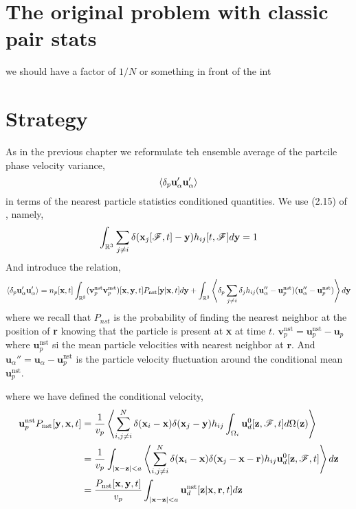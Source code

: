 \section{The original problem with classic pair stats}

we should have a factor of $1/N$ or something in front of the int 


\section{Strategy}

As in the previous chapter we reformulate teh ensemble average of the partcile phase velocity variance, 
\begin{equation}
    \pavg{\textbf{u}_\alpha'\textbf{u}_\alpha'}
\end{equation}
in terms of the nearest particle statistics conditioned quantities. 
We use (2.15) of \citet{zhang2021ensemble}, namely, 
\begin{equation}
    \int_{\mathbb{R}^3}
    \sum_{j\neq i}
    \delta(\textbf{x}_j[\FF,t] - \textbf{y}) h_{ij}[t,\FF] d\textbf{y}
    = 1
\end{equation}
And introduce the relation, 
\begin{equation}
    \pavg{\textbf{u}_\alpha'\textbf{u}_\alpha'}
    = 
    n_p[\textbf{x},t]
    \int_{\mathbb{R}^3}
    (\textbf{v}^\text{nst}_p
    \textbf{v}^\text{nst}_p)[\textbf{x},\textbf{y},t]
    P_\text{nst}[\textbf{y}|\textbf{x},t]
    d\textbf{y}
    + 
    \int_{\mathbb{R}^3}
    \pavg{
        \sum_{j\neq i }
        \delta_j 
        h_{ij} 
        (\textbf{u}_\alpha'' - \textbf{u}^\text{nst}_p)
        (\textbf{u}_\alpha'' - \textbf{u}^\text{nst}_p)
    }d \textbf{y}
\end{equation}
where we recall that $P_{nst}$ is the probability of finding the nearest neighbor at the position of \textbf{r} knowing that the particle is present at \textbf{x} at time $t$. 
$\textbf{v}^\text{nst}_p = \textbf{u}_p^\text{nst} - \textbf{u}_p$ where $\textbf{u}_p^\text{nst}$ si the mean particle velocities with nearest neighbor at $\textbf{r}$. 
And $\textbf{u}_\alpha'' = \textbf{u}_\alpha - \textbf{u}^\text{nst}_p$ is the particle velocity fluctuation around the conditional mean $\textbf{u}^\text{nst}_p$. 

where we have defined the conditional velocity, 
\begin{align}
    \textbf{u}_p^\text{nst} P_\text{nst}[\textbf{y},\textbf{x},t]
    &= \frac{1}{v_p} \avg{\sum_{i,j\neq i}^N \delta(\textbf{x}_i - \textbf{x})\delta(\textbf{x}_j - \textbf{y}) h_{ij} \intO[i]{\textbf{u}_d^0[\textbf{z},\FF,t]}(\textbf{z})} \\
    &= \frac{1}{v_p} \int_{|\textbf{x} - \textbf{z}|<a}\avg{\sum_{i,j\neq i}^N \delta(\textbf{x}_i - \textbf{x})\delta(\textbf{x}_j - \textbf{x} - \textbf{r}) h_{ij} \textbf{u}_d^0[\textbf{z},\FF,t]}d\textbf{z} \\
    &= \frac{P_\text{nst}[\textbf{x},\textbf{y},t] }{v_p} \int_{|\textbf{x} - \textbf{z}|<a} \textbf{u}_d^\text{nst}[\textbf{z}|\textbf{x},\textbf{r},t] d\textbf{z} \\
\end{align}


